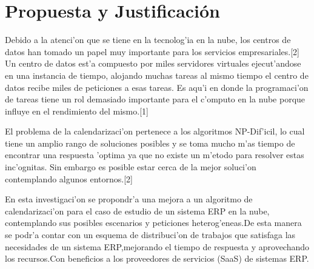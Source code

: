 
\chapter*{Propuesta y Justificaci\'on}

Debido a la atenci'on que se tiene en la tecnolog'ia en la nube, los centros de datos han tomado un papel muy importante para los servicios empresariales.[2] Un centro de datos est'a compuesto por miles servidores virtuales ejecut'andose en una instancia de tiempo, alojando muchas tareas al mismo tiempo el centro de datos recibe miles de peticiones a esas tareas. Es aqu'i en donde la programaci'on de tareas tiene un rol demasiado importante para el c'omputo en la nube porque influye en el rendimiento del mismo.[1] 

El problema de la calendarizaci'on pertenece a los algoritmos NP-Dif'icil, lo cual tiene un amplio rango de soluciones posibles y se toma mucho m'as tiempo de encontrar una respuesta 'optima ya que no existe un m'etodo para resolver estas inc'ognitas. Sin embargo es posible estar cerca de la mejor soluci'on contemplando algunos entornos.[2]

En esta investigaci'on se propondr'a una mejora a un algoritmo de calendarizaci'on para el caso de estudio de un sistema ERP en la nube, contemplando sus posibles escenarios y peticiones heterog'eneas.De esta manera se podr'a contar con un esquema de distribuci'on de trabajos que satisfaga las necesidades de un sistema ERP,mejorando el tiempo de respuesta y aprovechando los recursos.Con beneficios a los proveedores de servicios (SaaS) de sistemas ERP.